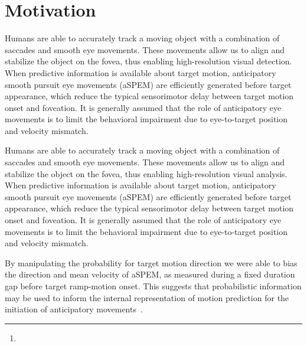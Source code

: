 \documentclass[profile,final,english, draft]{article}%
\title{\Title}%
\author{\AuthorA, 
\AuthorC,  \AuthorD\thanks{\Address} }
\begin{document}
%
\maketitle%
\begin{abstract}
\Abstract
\end{abstract}

\section{Motivation}

Humans are able to accurately track a moving object with a combination of saccades and smooth eye movements. These movements allow us to align and stabilize the object on the fovea, thus enabling high-resolution visual detection. When predictive information is available about target motion, anticipatory smooth pursuit eye movements (aSPEM) are efficiently generated before target appearance, which reduce the typical sensorimotor delay between target motion onset and foveation. It is generally assumed that the role of anticipatory eye movements is to limit the behavioral impairment due to eye-to-target position and velocity mismatch.

Humans are able to accurately track a moving object with a combination of saccades and smooth eye movements. These movements allow us to align and stabilize the object on the fovea, thus enabling high-resolution visual analysis. When predictive information is available about target motion, anticipatory smooth pursuit eye movements (aSPEM) are efficiently generated before target appearance, which reduce the typical sensorimotor delay between target motion onset and foveation. It is generally assumed that the role of anticipatory eye movements is to limit the behavioral impairment due to eye-to-target position and velocity mismatch.



By manipulating the probability for target motion direction we were able to bias the direction and mean velocity of aSPEM, as measured during a fixed duration gap before target ramp-motion onset. This suggests that probabilistic information may be used to inform the internal representation of motion prediction for the initiation of anticipatory movements~\parencite{Montagnini2010}.
\end{document}
